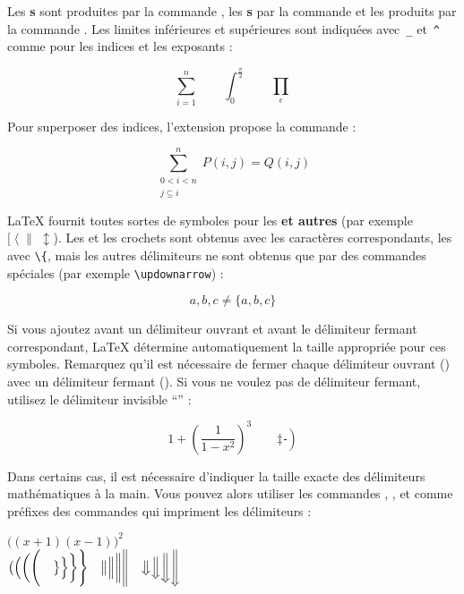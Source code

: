 Les \textbf{s} sont produites par la commande ,
les \textbf{s} par la commande  et les produits par la
commande . Les limites
inférieures et supérieures sont indiquées avec~\verb|_| et~\verb|^|
comme pour les indices et les exposants :
\begin{example}
\begin{equation*}
\sum_{i=1}^n \qquad
\int_0^{\frac{\pi}{2}} \qquad
\prod_\epsilon
\end{equation*}
\end{example}

Pour superposer des indices, l'extension  propose la
commande  :
\begin{example}
\begin{equation*}
\sum^n_{\substack{0<i<n \\
        j\subseteq i}}
   P(i,j) = Q(i,j)
\end{equation*}
\end{example}

\LaTeX{} fournit toutes sortes de symboles pour les
\textbf{ et autres } (par exemple
$[\;\langle\;\|\;\updownarrow$). Les  et les crochets
sont obtenus avec les caractères correspondants, les 
avec \verb|\{|, mais les autres délimiteurs ne sont obtenus que par des
commandes spéciales (par exemple \verb|\updownarrow|) :
\begin{example}
\begin{equation*}
{a,b,c} \neq \{a,b,c\}
\end{equation*}
\end{example}

Si vous ajoutez  avant un délimiteur ouvrant et
\vadjust{\pagebreak[3]}%
 avant le délimiteur fermant correspondant, \LaTeX{} détermine
automatiquement la taille appropriée pour ces symboles. Remarquez
qu'il est nécessaire de fermer chaque délimiteur ouvrant
() avec un délimiteur fermant (). Si vous
ne voulez pas de délimiteur fermant, utilisez le délimiteur invisible
\enquote{} :
\begin{example}
\begin{equation*}
1 + \left(\frac{1}{1-x^{2}}
    \right)^3 \qquad
\left. \ddagger \frac{~}{~}\right)
\end{equation*}
\end{example}

Dans certains cas, il est nécessaire d'indiquer la taille exacte des
délimiteurs mathématiques à la main. Vous pouvez alors utiliser les
commandes , ,  et  comme préfixes
des commandes qui impriment les délimiteurs :
\begin{example}
$\Big((x+1)(x-1)\Big)^{2}$\\
$\big( \Big( \bigg( \Bigg( \quad
\big\} \Big\} \bigg\} \Bigg\}\quad
\big\| \Big\| \bigg\| \Bigg\|\quad
\big\Downarrow \Big\Downarrow
\bigg\Downarrow \Bigg\Downarrow$
\end{example}

